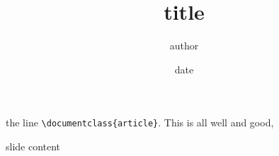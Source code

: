 the line \verb|\documentclass{article}|.  This is all well and good,
\title{title}
\author{author}
\date{date}
\begin{document}
\maketitle

\begin{slide}
  slide content
\end{slide}
\end{document}
